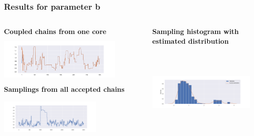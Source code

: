 \documentclass{beamer}
\begin{document}
\begin{frame}
	\frametitle{Results for parameter b}
	\begin{columns}
		\begin{column}{0.4\textwidth}
			{\scriptsize \textbf{Coupled chains from one core}}\\
			\includegraphics[width=6cm,height=2.5cm]{gk_all_pack/gk_all_chain_meeeting_1}
			\vspace{0.2cm}
			{\scriptsize \textbf{Samplings from all accepted chains}}\\
			\includegraphics[width=5cm,height=2.5cm]{gk_all_pack/gk_all_sampling_1}
		\end{column}
		\begin{column}{0.4\textwidth}
			{	\scriptsize \textbf{ Sampling histogram with estimated distribution}}\\
			\includegraphics[width=6cm,height=5cm]{gk_all_pack/gk_all_histogram_kernel_1}
			
		\end{column}
	\end{columns}
\end{frame}
\end{document}
